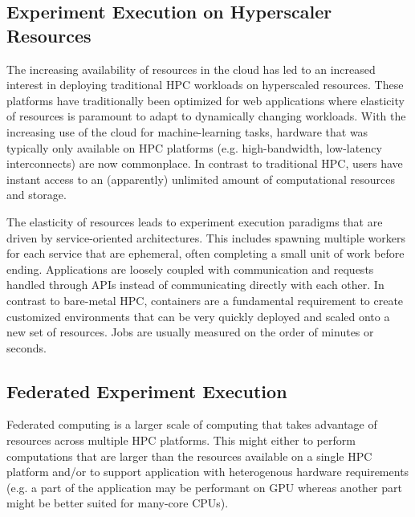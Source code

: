 \documentclass[utf8]{FrontiersinVancouver} %
\begin{document}
\subsection{Experiment Execution on Hyperscaler Resources}

The increasing availability of resources in the cloud has led to an increased interest in deploying traditional HPC workloads on hyperscaled resources. These platforms have traditionally been optimized for web applications where elasticity of resources is paramount to adapt to dynamically changing workloads.  With the increasing use of the cloud for machine-learning tasks, hardware that was typically only available on HPC platforms (e.g. high-bandwidth, low-latency interconnects) are now commonplace. In contrast to traditional HPC, users have instant access to an (apparently) unlimited amount of computational resources and storage.

The elasticity of resources leads to experiment execution paradigms that are driven by service-oriented architectures. This includes spawning multiple workers for each service that are ephemeral, often completing a small unit of work before ending. Applications are loosely coupled with communication and requests handled through APIs instead of communicating directly with each other.  In contrast to bare-metal HPC, containers are a fundamental requirement to create customized environments that can be very quickly deployed and scaled onto a new set of resources. Jobs are usually measured on the order of minutes or seconds.

\subsection{Federated Experiment Execution}

Federated computing is a larger scale of computing that takes advantage of resources across multiple HPC platforms. This might either to perform computations that are larger than the resources available on a single HPC platform and/or to support application with heterogenous hardware requirements (e.g. a part of the application may be performant on GPU whereas another part might be better suited for many-core CPUs). 
\end{document}
